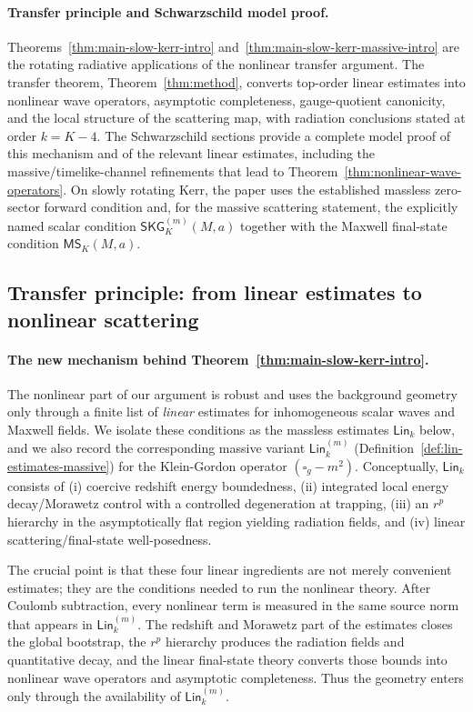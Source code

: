 \documentclass[11pt]{article}
\numberwithin{equation}{section}
\theoremstyle{plain}
\theoremstyle{definition}
\theoremstyle{remark}
\newcommand{\Lin}{\mathsf{Lin}}
\newcommand{\SKG}{\mathsf{SKG}}
\newcommand{\MScat}{\mathsf{MS}}
\begin{document}
\paragraph{Transfer principle and Schwarzschild model proof.}
Theorems~\ref{thm:main-slow-kerr-intro} and~\ref{thm:main-slow-kerr-massive-intro} are the rotating radiative applications of the nonlinear transfer argument.  The transfer theorem, Theorem~\ref{thm:method}, converts top-order linear estimates into nonlinear wave operators, asymptotic completeness, gauge-quotient canonicity, and the local structure of the scattering map, with radiation conclusions stated at order $k=K-4$.  The Schwarzschild sections provide a complete model proof of this mechanism and of the relevant linear estimates, including the massive/timelike-channel refinements that lead to Theorem~\ref{thm:nonlinear-wave-operators}.  On slowly rotating Kerr, the paper uses the established massless zero-sector forward condition and, for the massive scattering statement, the explicitly named scalar condition \(\SKG^{(m)}_K(M,a)\) together with the Maxwell final-state condition \(\MScat_K(M,a)\).

\subsection{Transfer principle: from linear estimates to nonlinear scattering}\label{subsec:method}

\paragraph{The new mechanism behind Theorem~\ref{thm:main-slow-kerr-intro}.}
The nonlinear part of our argument is robust and uses the background geometry only through a finite list of \emph{linear} estimates for inhomogeneous scalar waves and Maxwell fields. We isolate these conditions as the massless estimates $\Lin_{k}$ below, and we also record the corresponding massive variant $\Lin_{k}^{(m)}$ (Definition~\ref{def:lin-estimates-massive}) for the Klein-Gordon operator $(\square_g-m^{2})$. Conceptually, $\Lin_{k}$ consists of
(i) coercive redshift energy boundedness,
(ii) integrated local energy decay/Morawetz control with a controlled degeneration at trapping,
(iii) an $r^{p}$ hierarchy in the asymptotically flat region yielding radiation fields, and
(iv) linear scattering/final-state well-posedness.

The crucial point is that these four linear ingredients are not merely convenient estimates; they are the conditions needed to run the nonlinear theory. After Coulomb subtraction, every nonlinear term is measured in the same source norm that appears in $\Lin_{k}^{(m)}$. The redshift and Morawetz part of the estimates closes the global bootstrap, the $r^{p}$ hierarchy produces the radiation fields and quantitative decay, and the linear final-state theory converts those bounds into nonlinear wave operators and asymptotic completeness. Thus the geometry enters only through the availability of $\Lin_{k}^{(m)}$.
\end{document}
